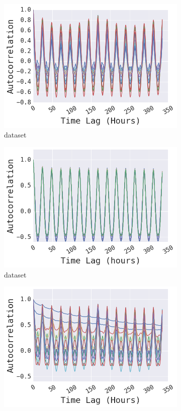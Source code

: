 \begin{figure}[!ht]
\begin{subfigure}{.23\textwidth}
  \centering
  \includegraphics[width=\linewidth]{fig-auto/autocorr_traffic.png}
  \caption{\traffic dataset}
\end{subfigure}
\begin{subfigure}{.23\textwidth}
  \centering
  \includegraphics[width=\linewidth]{fig-auto/autocorr_solar.png}
  \caption{\solar dataset}
\end{subfigure}
\begin{subfigure}{.23\textwidth}
  \centering
  \includegraphics[width=\linewidth]{fig-auto/autocorr_electricity.png}

\end{subfigure}
\end{figure}
